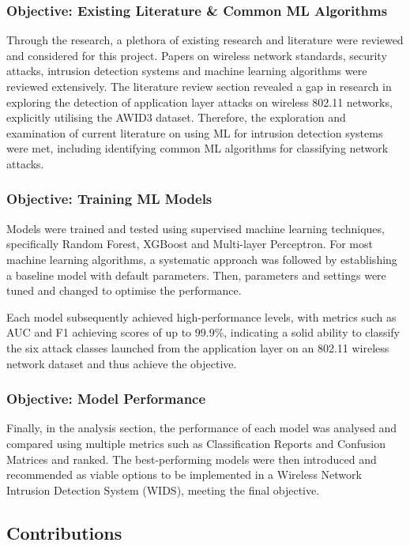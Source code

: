 \subsubsection*{Objective: Existing Literature \& Common ML Algorithms}

Through the research, a plethora of existing research and literature were reviewed and considered for this project. Papers on wireless network standards, security attacks, intrusion detection systems and machine learning algorithms were reviewed extensively. The literature review section revealed a gap in research in exploring the detection of application layer attacks on wireless 802.11 networks, explicitly utilising the AWID3 dataset. Therefore, the exploration and examination of current literature on using ML for intrusion detection systems were met, including identifying common ML algorithms for classifying network attacks. 
 
\subsubsection*{Objective: Training ML Models}
Models were trained and tested using supervised machine learning techniques, specifically Random Forest, XGBoost and Multi-layer Perceptron. For most machine learning algorithms, a systematic approach was followed by establishing a baseline model with default parameters. Then, parameters and settings were tuned and changed to optimise the performance. 

Each model subsequently achieved high-performance levels, with metrics such as AUC and F1 achieving scores of up to 99.9\%, indicating a solid ability to classify the six attack classes launched from the application layer on an 802.11 wireless network dataset and thus achieve the objective.

\subsubsection*{Objective: Model Performance}

Finally, in the analysis section, the performance of each model was analysed and compared using multiple metrics such as Classification Reports and Confusion Matrices and ranked. The best-performing models were then introduced and recommended as viable options to be implemented in a Wireless Network Intrusion Detection System (WIDS), meeting the final objective.

\subsection{Contributions}

